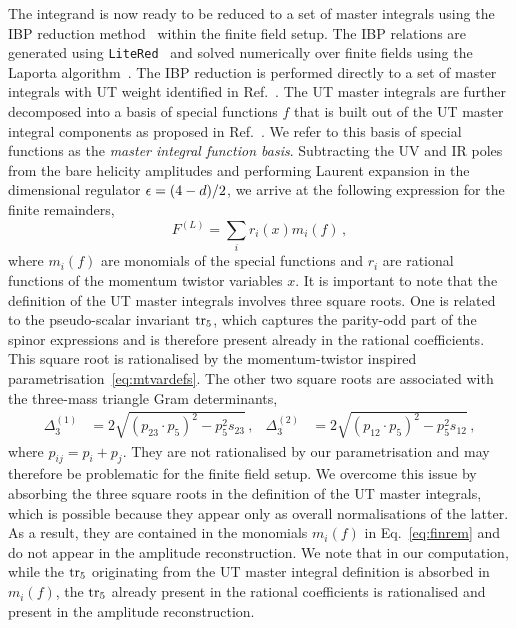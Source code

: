 \documentclass[main.tex]{subfiles}
\begin{document}
The integrand is now ready to be reduced to a set of master integrals using the IBP reduction method~\cite{Chetyrkin:1981qh} within the finite field setup. The IBP relations are generated using \texttt{LiteRed}~\cite{Lee:2012cn} and solved numerically over finite fields using the Laporta algorithm~\cite{Laporta:2001dd}. The IBP reduction is performed directly to a set of master integrals with UT weight identified in Ref.~\cite{Abreu:2020jxa}. The UT master integrals are further decomposed into a basis of special functions $f$ that is built out of the UT master integral components as proposed in Ref.~\cite{Badger:2021nhg}. We refer to this basis of special functions as the \textit{master integral function basis}.
Subtracting the UV and IR poles from the bare helicity amplitudes and performing Laurent expansion in the dimensional regulator $\epsilon = (4-d)/2$, we arrive at the following expression for the finite remainders,
\begin{equation}
F^{(L)} = \sum_{i} r_i(x) m_i(f)\,,
\label{eq:finrem}
\end{equation}
where $m_i(f)$ are monomials of the special functions and $r_i$ are rational functions of the momentum twistor variables $x$. It is important to note that the definition of the UT master integrals involves three square roots. One is related to the pseudo-scalar invariant $\operatorname{\rm tr}_5$, which captures the parity-odd part of the spinor expressions and is therefore present already in the rational coefficients. This square root is rationalised by the momentum-twistor inspired parametrisation~\eqref{eq:mtvardefs}. The other two square roots are associated with the three-mass triangle Gram determinants,
\begin{align}
  \Delta_3^{(1)} &= 2 \sqrt{(p_{23} \cdot p_{5})^2 - p_5^2 s_{23}} \,,&
  \Delta_3^{(2)} &= 2 \sqrt{(p_{12} \cdot p_{5})^2 - p_5^2 s_{12}} \,,
  \label{eq:squareroots}
\end{align}
where $p_{ij} = p_i + p_j$.
They are not rationalised by our parametrisation and may therefore be problematic for the finite field setup. We overcome this issue by absorbing the three square roots in the definition of the UT master integrals, which is possible because they appear only as overall normalisations of the latter. As a result, they are contained in the monomials $m_i(f)$ in Eq.~\eqref{eq:finrem} and do not appear in the amplitude reconstruction.
 We note that in our computation, while the $\operatorname{\rm tr}_5$ originating from the UT master integral definition is absorbed in $m_i(f)$, 
the $\operatorname{\rm tr}_5$ already present in the rational coefficients is rationalised and present in the amplitude reconstruction.
\end{document}
